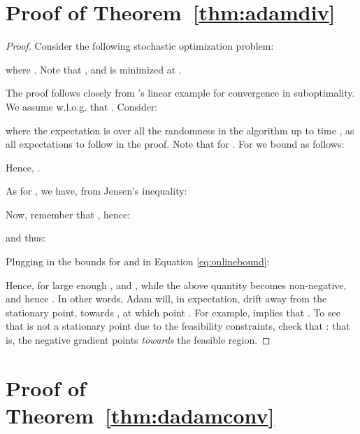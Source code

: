 \documentclass{article}
\newcommand{\thmref}[1]{Theorem~\ref{#1}}
\begin{document}
\section{Proof of \thmref{thm:adamdiv}}
\label{sec:proof1}

\begin{proof}
Consider the following stochastic optimization problem:

where .  Note
that , and  is minimized at
.

The proof follows closely from \citet{amsgrad}'s linear example for convergence in
suboptimality.  We assume w.l.o.g. that .  Consider:


where the expectation is over all the randomness in the algorithm up to time
, as all expectations to follow in the proof.  Note that  for
. For  we bound  as follows:


Hence,
.

As for , we have, from Jensen's inequality:


Now, remember that ,
hence:

and thus:


Plugging in the bounds for  and  in Equation \ref{eq:onlinebound}:


Hence, for large enough , and ,
 while the above quantity becomes
non-negative, and hence .  In other words, Adam
will, in expectation, drift away from the stationary point, towards ,
at which point .  For example, 
implies that
. To see that  is not a stationary point due to the feasibility constraints, check that : that is, the negative gradient points \textit{towards} the feasible region.
\end{proof}

\section{Proof of \thmref{thm:dadamconv}}
\label{sec:proof2}
\end{document}
